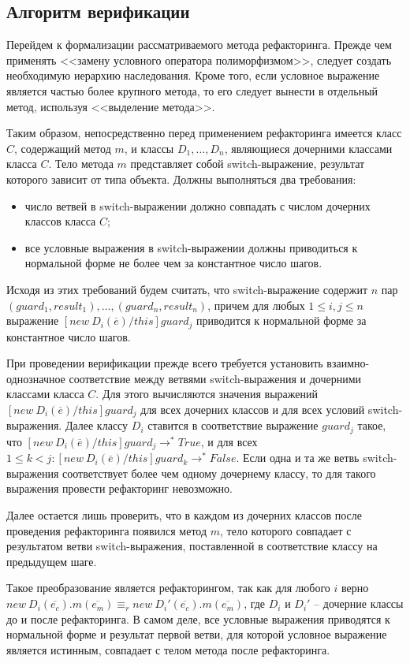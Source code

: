 \subsection{Алгоритм верификации}
Перейдем к формализации рассматриваемого метода рефакторинга. Прежде чем применять <<замену условного оператора полиморфизмом>>,
следует создать необходимую иерархию наследования. Кроме того, если условное выражение является частью более крупного метода,
то его следует вынести в отдельный метод, используя <<выделение метода>>.

Таким образом, непосредственно перед применением рефакторинга имеется класс $C$, содержащий метод $m$, и классы $D_1, \ldots, D_n$, являющиеся дочерними классами класса $C$.
Тело метода $m$ представляет собой switch-выражение, результат которого зависит от типа объекта. 
Должны выполняться два требования:
\begin{itemize}
    \item число ветвей в switch-выражении должно совпадать с числом дочерних классов класса $C$;
    \item все условные выражения в switch-выражении должны приводиться к нормальной форме не более чем за константное число шагов.
\end{itemize}
Исходя из этих требований будем считать, что switch-выражение содержит $n$ пар $(guard_1, result_1), \ldots, (guard_n, result_n)$,
причем для любых $1 \le i, j \le n$ выражение $[new\ D_i(\overline{e})/this]guard_j$ приводится к нормальной форме за константное число шагов.

При проведении верификации прежде всего требуется установить взаимно-однозначное соответствие между ветвями switch-выражения и дочерними классами класса $C$.
Для этого вычисляются значения выражений $[new\ D_i(\overline{e})/this]guard_j$ для всех дочерних классов и для всех условий switch-выражения.
Далее классу $D_i$ ставится в соответствие выражение $guard_j$ такое, что $[new\ D_i(\overline{e})/this]guard_j \rightarrow^* True$,
и для всех $1 \le k < j: [new\ D_i(\overline{e})/this]guard_k \rightarrow^* False$. Если одна и та же ветвь switch-выражения соответствует более чем одному
дочернему классу, то для такого выражения провести рефакторинг невозможно.

Далее остается лишь проверить, что в каждом из дочерних классов после проведения рефакторинга появился метод $m$,
тело которого совпадает с результатом ветви switch-выражения, поставленной в соответствие классу на предыдущем шаге.

Такое преобразование является рефакторингом, так как для любого $i$ верно $new\ D_i(\overline{e_c}).m(\overline{e_m}) \equiv_r new\ D_i'(\overline{e_c}).m(\overline{e_m})$,
где $D_i$ и $D_i'$ -- дочерние классы до и после рефакторинга. В самом деле, все условные выражения приводятся к нормальной форме и результат первой ветви,
для которой условное выражение является истинным, совпадает с телом метода после рефакторинга.

